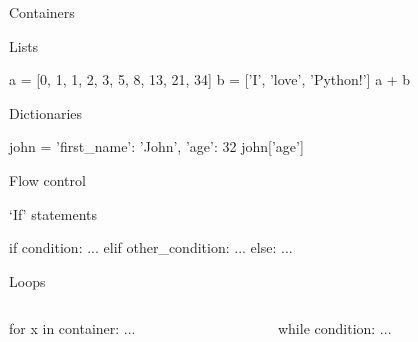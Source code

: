 \begin{frame}[fragile]{Containers}
    \vspace{0.5em}
    \begin{block}{Lists}
        \begin{py3}
            a = [0, 1, 1, 2, 3, 5, 8, 13, 21, 34]
            b = ['I', 'love', 'Python!']
            a + b
        \end{py3}
    \end{block}
    \vspace{-0.75em}
    \begin{block}{Dictionaries}
        \begin{py3}
            john = {
                'first_name': 'John',
                'age': 32
            }
            john['age']
        \end{py3}
    \end{block}
\end{frame}

\begin{frame}[fragile]{Flow control}
    \vspace{0.5em}
    \begin{block}{`If' statements}
        \begin{py3}
            if condition:
                ...
            elif other_condition:
                ...
            else:
                ...
        \end{py3}
    \end{block}
    \vspace{-0.75em}
    \begin{block}{Loops}
        \vspace{-0.9em}
        \begin{columns}
            \begin{column}{0.465\textwidth}
                \begin{py3}
                    for x in container:
                        ...
                \end{py3}
            \end{column}
            \begin{column}{0.465\textwidth}
                \begin{py3}
                    while condition:
                        ...
                \end{py3}
            \end{column}
        \end{columns}
    \end{block}
\end{frame}

